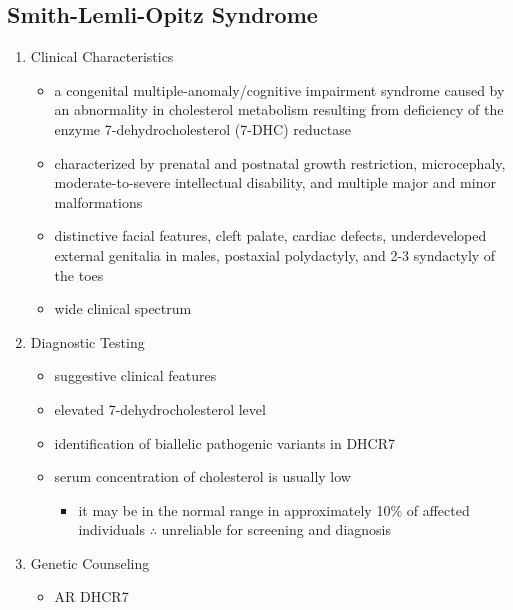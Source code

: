 \documentclass[12pt]{scrartcl}
\begin{document}
\subsection{Smith-Lemli-Opitz Syndrome}
\label{sec:org60cf8dc}
\begin{enumerate}
\item Clinical Characteristics
\label{sec:orge0e4498}
\begin{itemize}
\item a congenital multiple-anomaly/cognitive impairment syndrome caused
by an abnormality in cholesterol metabolism resulting from
deficiency of the enzyme 7-dehydrocholesterol (7-DHC) reductase
\item characterized by prenatal and postnatal growth restriction,
microcephaly, moderate-to-severe intellectual disability, and
multiple major and minor malformations
\item distinctive facial features, cleft palate, cardiac defects,
underdeveloped external genitalia in males, postaxial polydactyly,
and 2-3 syndactyly of the toes
\item wide clinical spectrum
\end{itemize}
\item Diagnostic Testing
\label{sec:orgb904869}
\begin{itemize}
\item suggestive clinical features
\item elevated 7-dehydrocholesterol level
\item identification of biallelic pathogenic variants in DHCR7
\item serum concentration of cholesterol is usually low
\begin{itemize}
\item it may be in the normal range in approximately 10\% of affected
individuals \(\therefore\) unreliable for screening and diagnosis
\end{itemize}
\end{itemize}
\item Genetic Counseling
\label{sec:org8291841}
\begin{itemize}
\item AR DHCR7
\end{itemize}
\end{enumerate}
\end{document}
